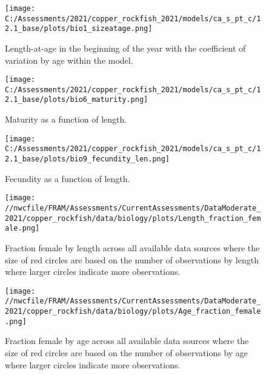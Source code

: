 \documentclass[11pt,
  english,
  a4paper,
]{article}
\begin{document}

\begin{figure}
\centering
\texttt{[image: C:/Assessments/2021/copper\_rockfish\_2021/models/ca\_s\_pt\_c/12.1\_base/plots/bio1\_sizeatage.png]}
\caption{Length-at-age in the beginning of the year with the coefficient of variation by age within the model.\label{fig:len-age-ss}}
\end{figure}

\tagmcend\tagstructend


\begin{figure}
\centering
\texttt{[image: C:/Assessments/2021/copper\_rockfish\_2021/models/ca\_s\_pt\_c/12.1\_base/plots/bio6\_maturity.png]}
\caption{Maturity as a function of length.\label{fig:maturity}}
\end{figure}

\tagmcend\tagstructend


\begin{figure}
\centering
\texttt{[image: C:/Assessments/2021/copper\_rockfish\_2021/models/ca\_s\_pt\_c/12.1\_base/plots/bio9\_fecundity\_len.png]}
\caption{Fecundity as a function of length.\label{fig:fecundity}}
\end{figure}

\tagmcend\tagstructend


\begin{figure}
\centering
\texttt{[image: //nwcfile/FRAM/Assessments/CurrentAssessments/DataModerate\_2021/copper\_rockfish/data/biology/plots/Length\_fraction\_female.png]}
\caption{Fraction female by length across all available data sources where the size of red circles are based on the number of observations by length where larger circles indicate more observations.\label{fig:len-sex-ratio}}
\end{figure}

\tagmcend\tagstructend


\begin{figure}
\centering
\texttt{[image: //nwcfile/FRAM/Assessments/CurrentAssessments/DataModerate\_2021/copper\_rockfish/data/biology/plots/Age\_fraction\_female.png]}
\caption{Fraction female by age across all available data sources where the size of red circles are based on the number of observations by age where larger circles indicate more observations.\label{fig:age-sex-ratio}}
\end{figure}
\end{document}
